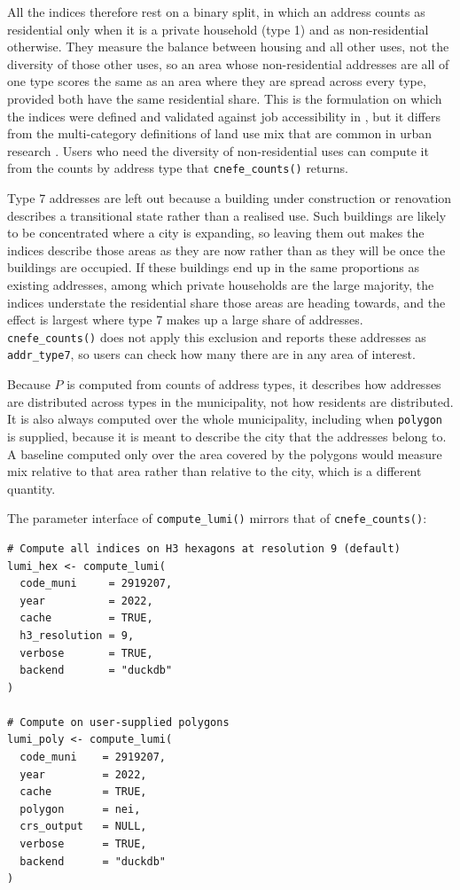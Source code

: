 All the indices therefore rest on a binary split, in which an address
counts as residential only when it is a private household (type 1) and
as non-residential otherwise. They measure the balance between housing
and all other uses, not the diversity of those other uses, so an area
whose non-residential addresses are all of one type scores the same as
an area where they are spread across every type, provided both have the
same residential share. This is the formulation on which the indices
were defined and validated against job accessibility in
\citet{pedreirajr2026bgbi}, but it differs from the multi-category definitions
of land use mix that are common in urban research \citep{song2013}. Users who
need the diversity of non-residential uses can compute it from the
counts by address type that \texttt{cnefe\_counts()} returns.

Type 7 addresses are left out because a building under construction or
renovation describes a transitional state rather than a realised use.
Such buildings are likely to be concentrated where a city is expanding,
so leaving them out makes the indices describe those areas as they are
now rather than as they will be once the buildings are occupied. If
these buildings end up in the same proportions as existing addresses,
among which private households are the large majority, the indices
understate the residential share those areas are heading towards, and
the effect is largest where type 7 makes up a large share of addresses.
\texttt{cnefe\_counts()} does not apply this exclusion and reports these
addresses as \texttt{addr\_type7}, so users can check how many there are in any
area of interest.

Because \(P\) is computed from counts of address types, it describes how
addresses are distributed across types in the municipality, not how
residents are distributed. It is also always computed over the whole
municipality, including when
\texttt{polygon} is supplied, because it is meant to describe the city that
the addresses belong to. A baseline computed only over the area covered
by the polygons would measure mix relative to that area rather than
relative to the city, which is a different quantity.

The parameter interface of \texttt{compute\_lumi()} mirrors that of
\texttt{cnefe\_counts()}:

\begin{verbatim}
# Compute all indices on H3 hexagons at resolution 9 (default)
lumi_hex <- compute_lumi(
  code_muni     = 2919207,
  year          = 2022,
  cache         = TRUE,
  h3_resolution = 9,
  verbose       = TRUE,
  backend       = "duckdb"
)

# Compute on user-supplied polygons
lumi_poly <- compute_lumi(
  code_muni    = 2919207,
  year         = 2022,
  cache        = TRUE,
  polygon      = nei,
  crs_output   = NULL,
  verbose      = TRUE,
  backend      = "duckdb"
)
\end{verbatim}

